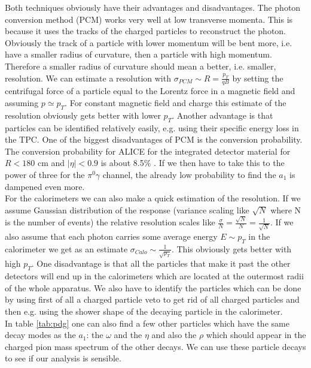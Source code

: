 Both techniques obviously have their advantages and disadvantages. The photon conversion method (PCM) works very well at low transverse momenta. This is because it uses the tracks of the charged particles to reconstruct the photon. Obviously the track of a particle with lower momentum will be bent more, i.e. have a smaller radius of curvature, then a particle with high momentum. Therefore a smaller radius of curvature should mean a better, i.e. smaller, resolution. We can estimate a resolution with $\sigma_{PCM} \sim R = \frac{p_T}{qB}$ by setting the centrifugal force of a particle equal to the Lorentz force in a magnetic field and assuming $p \simeq p_T$. For constant magnetic field and charge this estimate of the resolution obviously gets better with lower $p_T$. Another advantage is that particles can be identified relatively easily, e.g. using their specific energy loss in the TPC. One of the biggest disadvantages of PCM is the conversion probability. The conversion probability for ALICE for the integrated detector material for $R<180$ cm and $|\eta|<0.9$ is about 8.5\% \cite{ALICEPerfRep}. If we then have to take this to the power of three for the $\pi^0\gamma$ channel, the already low probability to find the $a_1$ is dampened even more. \\
For the calorimeters we can also make a quick estimation of the resolution. If we assume Gaussian distribution of the response (variance scaling like $\sqrt{N}$ where N is the number of events) the relative resolution scales like $\frac{\sigma}{N} = \frac{\sqrt{N}}{N} = \frac{1}{\sqrt{N}}$. If we also assume that each photon carries some average energy $E \sim p_T$ in the calorimeter we get as an estimate $\sigma_{Calo} \sim \frac{1}{\sqrt{p_T}}$. This obviously gets better with high $p_T$. One disadvantage is that all the particles that make it past the other detectors will end up in the calorimeters which are located at the outermost radii of the whole apparatus. We also have to identify the particles which can be done by using first of all a charged particle veto to get rid of all charged particles and then e.g. using the shower shape of the  decaying particle in the calorimeter. \\
In table \ref{tab:pdg} one can also find a few other particles which have the same decay modes as the $a_1$: the $\omega$ and the $\eta$ and also the $\rho$ which should appear in the charged pion mass spectrum of the other decays. We can use these particle decays to see if our analysis is sensible.

